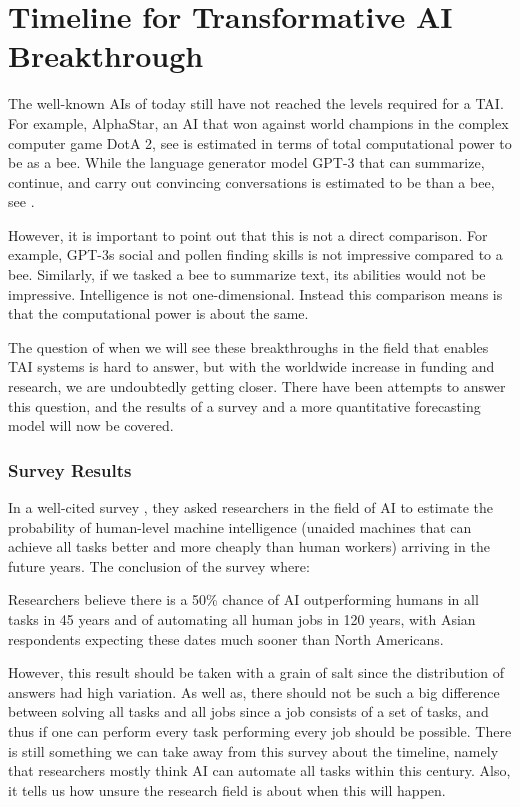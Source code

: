 \documentclass[12pt,A4]{report}
\theoremstyle{definition}
\begin{document}
\section{Timeline for Transformative AI Breakthrough}
The well-known AIs of today still have not reached the levels required for a TAI. For example, AlphaStar, an AI that won against world champions in the complex computer game DotA 2, see \citet{ALphaStar} is estimated in terms of total computational power to be  as a bee. While the language generator model GPT-3 that can summarize, continue, and carry out convincing conversations is estimated to be  than a bee, see \citet{Ajeya}.

However, it is important to point out that this is not a direct comparison. For example, GPT-3s social and pollen finding skills is not impressive compared to a bee. Similarly, if we tasked a bee to summarize text, its abilities would not be impressive. Intelligence is not one-dimensional. Instead this comparison means is that the computational power is about the same. 

The question of when we will see these breakthroughs in the field that enables TAI systems is hard to answer, but with the worldwide increase in funding and research, we are undoubtedly getting closer. There have been attempts to answer this question, and the results of a survey and a more quantitative forecasting model will now be covered. 

\subsubsection{Survey Results}
In a well-cited survey \citet{Grace}, they asked researchers in the field of AI to estimate the probability of human-level machine intelligence (unaided machines that can achieve all tasks better and more cheaply than human workers) arriving in the future years. The conclusion of the survey where:
\begin{displayquote}
Researchers believe there is a 50\% chance of AI outperforming humans in all tasks in 45 years and of automating all human jobs in 120 years, with Asian respondents expecting these dates much sooner than North Americans.
\end{displayquote}
However, this result should be taken with a grain of salt since the distribution of answers had high variation. As well as, there should not be such a big difference between solving all tasks and all jobs since a job consists of a set of tasks, and thus if one can perform every task performing every job should be possible. There is still something we can take away from this survey about the timeline, namely that researchers mostly think AI can automate all tasks within this century. Also, it tells us how unsure the research field is about when this will happen. 
\end{document}
